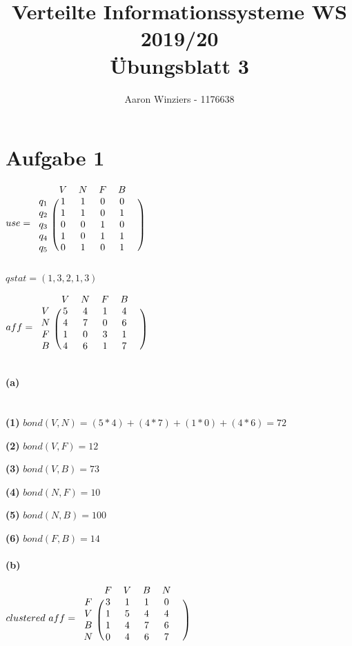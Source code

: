 \documentclass[11pt,a4paper,parskip=half ]{scrartcl}
\author{Aaron Winziers - 1176638}
\title{Verteilte Informationssysteme WS 2019/20\\\LARGE{Übungsblatt 3}}
\begin{document}
	\maketitle
	
	\section*{Aufgabe 1}
	$ use =
	\begin{blockarray}{cccccc}
	& V & N & F & B &  \\
	\begin{block}{c(ccccc)}
	q_{1} & 1 & 1 & 0 & 0 \\
	q_{2} & 1 & 1 & 0 & 1 \\
	q_{3} & 0 & 0 & 1 & 0 \\
	q_{4} & 1 & 0 & 1 & 1 \\
	q_{5} & 0 & 1 & 0 & 1 \\
	\end{block}
	\end{blockarray}
	$
	
	$ qstat = (1,3,2,1,3)$
	
	$ aff = 
	\begin{blockarray}{cccccc}
	& V & N & F & B &  \\
	\begin{block}{c(ccccc)}
	V & 5 & 4 & 1 & 4 \\
	N & 4 & 7 & 0 & 6 \\
	F & 1 & 0 & 3 & 1 \\
	B & 4 & 6 & 1 & 7 \\
	\end{block}
	\end{blockarray}
	$
	
	\paragraph{(a)}~\\
	\textbf{(1)} $bond(V, N) = (5*4)+(4*7)+(1*0)+(4*6) = 72$

	\textbf{(2)} $bond(V, F) = 12$
	
	\textbf{(3)} $bond(V, B) = 73$
	
	\textbf{(4)} $bond(N, F) = 10$
	
	\textbf{(5)} $bond(N, B) = 100$
	
	\textbf{(6)} $bond(F, B) = 14$
	
	
	\paragraph{(b)}
	$ clustered~ aff = 
	\begin{blockarray}{cccccc}
	& F & V & B & N &  \\
	\begin{block}{c(ccccc)}
	F & 3 & 1 & 1 & 0 \\
	V & 1 & 5 & 4 & 4 \\
	B & 1 & 4 & 7 & 6 \\
	N & 0 & 4 & 6 & 7 \\
	\end{block}
	\end{blockarray}
	$
	
\end{document}
